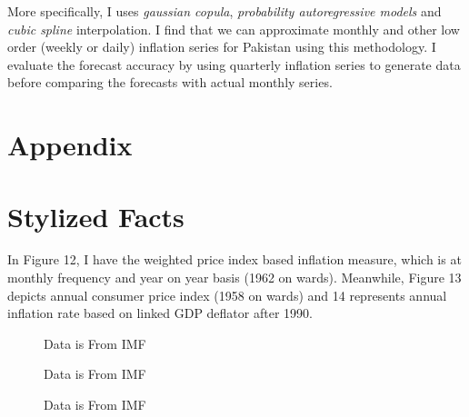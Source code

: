 \documentclass[12pt]{article}
\newcommand{\1}{\mathbbm 1}
\begin{document}
		More specifically, I uses \textit{gaussian copula}, \textit{probability autoregressive models} and \textit{cubic spline} interpolation. I find that we can approximate monthly and other low order (weekly or daily) inflation series for Pakistan using this methodology. I evaluate the forecast accuracy by using quarterly inflation series to generate data before comparing the forecasts with actual monthly series.
		
		
		
		
		
		
		
		
		
		
		
		
		
		\newpage
		
		
		
		
		
		
		
		
		
		
		
		
		\section{Appendix}
		
		\section*{Stylized Facts}
		
		In Figure 12, I have the weighted price index based inflation measure, which is at monthly frequency and year on year basis (1962 on wards). Meanwhile, Figure 13 depicts annual consumer price index (1958 on wards) and 14 represents annual inflation rate based on linked GDP deflator after 1990.
		
			\begin{figure}[H]
			\centering
			\scalebox{0.6}{}
			\hfill
			\caption{Data is From IMF}
		\end{figure}
	
	\begin{figure}[H]
		\centering
		\scalebox{0.6}{}
		\hfill
		\caption{Data is From IMF}
	\end{figure}

\begin{figure}[H]
	\centering
	\scalebox{0.6}{}
	\hfill
	\caption{Data is From IMF}
\end{figure}
	
	\newpage{}
		
\end{document}
